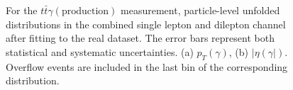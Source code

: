 \begin{figure}[ht]
  \centering
  \quad\quad
  \caption{For the $t\bar{t}\gamma(\mathrm{production})$ measurement, particle-level unfolded distributions in the combined single lepton and dilepton channel after fitting to the real dataset. 
  The error bars represent both statistical and systematic uncertainties. (a) $p_T(\gamma)$, (b) $|\eta(\gamma|)$. Overflow events are included in the last bin of the corresponding distribution.}
  \label{fig:pt_unfolded_dist_sldl_tty_prod_realdata}
\end{figure}
\FloatBarrier



